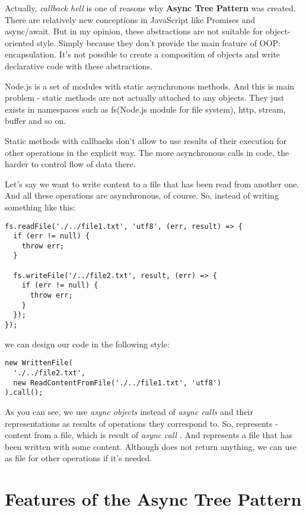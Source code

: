 \documentclass{article}
\newcommand{\cit}[1]{{\fontfamily{qcr}\selectfont{\textit{\textbf{\textcolor{darkgray}{#1}}}}}}
\begin{document}
Actually, \textit{callback hell} is one of reasons why \textbf{Async Tree Pattern} was created. There are relatively new conceptions in JavaScript like Promises and async/await. But in my opinion, these abstractions are not suitable for object-oriented style. Simply because they don't provide the main feature of OOP: encapsulation. 
It's not possible to create a composition of objects and write declarative code with these abstractions.

Node.js is a set of modules with static asynchronous methods. And this is main problem - static methods are not actually attached to any objects. They just exists in namespaces such as fs(Node.js module for file system), http, stream, buffer and so on.

Static methods with callbacks don't allow to use results of their execution for other operations in the explicit way. The more asynchronous calls in code, the harder to control flow of data there.

Let's say we want to write content to a file that has been read from another one. And all these operations are asynchronous, of course. So, instead of writing something like this:

\begin{lstlisting}
fs.readFile('./../file1.txt', 'utf8', (err, result) => {
  if (err != null) {
    throw err;
  }
 
  fs.writeFile('/../file2.txt', result, (err) => {
    if (err != null) {
      throw err;
    }
  });
});
\end{lstlisting}

we can design our code in the following style:

\begin{lstlisting}
new WrittenFile(
  './../file2.txt',
  new ReadContentFromFile('./../file1.txt', 'utf8')
).call();
\end{lstlisting}

As you can see, we use \textit{async objects} instead of \textit{async calls} and their representations as results of operations they correspond to. So, \cit{ReadContentFromFile} represents \cit{string} - content from a file, which is result of \textit{async call} \cit{fs.readFile}. And \cit{WrittenFile} represents a file that has been written with some content. Although \cit{fs.WriteFile} does not return anything, we can use \cit{WrittenFile} as file for other operations if it's needed.

\section{Features of the Async Tree Pattern}
\end{document}
